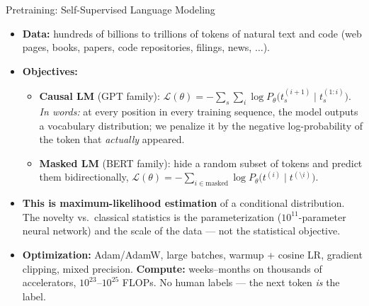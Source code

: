 \begin{frame}{Pretraining: Self-Supervised Language Modeling}
\begin{itemize}
\item \textbf{Data:} hundreds of billions to trillions of tokens of natural text and code (web pages, books, papers, code repositories, filings, news, $\ldots$).

\medskip
\item \textbf{Objectives:}
\begin{itemize}
    \item \textbf{Causal LM} (GPT family): $\mathcal{L}(\theta) = -\sum_{s}\sum_{i} \log P_{\theta}\bigl(t_{s}^{(i+1)} \mid t_{s}^{(1:i)}\bigr)$.
    \emph{In words:} at every position in every training sequence, the model outputs a vocabulary distribution; we penalize it by the negative log-probability of the token that \emph{actually} appeared.
    \item \textbf{Masked LM} (BERT family): hide a random subset of tokens and predict them bidirectionally, $\mathcal{L}(\theta) = -\sum_{i \in \text{masked}} \log P_{\theta}\bigl(t^{(i)} \mid t^{(\setminus i)}\bigr)$.
\end{itemize}

\medskip
\item \textbf{This is maximum-likelihood estimation} of a conditional distribution. The novelty vs.\ classical statistics is the parameterization ($10^{11}$-parameter neural network) and the scale of the data --- not the statistical objective.

\medskip
\item \textbf{Optimization:} Adam/AdamW, large batches, warmup + cosine LR, gradient clipping, mixed precision. \textbf{Compute:} weeks--months on thousands of accelerators, $10^{23}$--$10^{25}$ FLOPs. No human labels --- the next token \emph{is} the label.
\end{itemize}
\end{frame}

